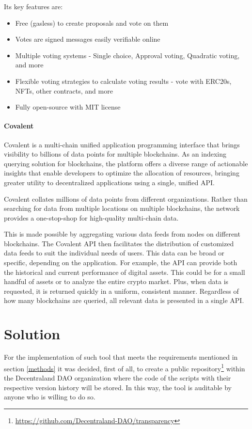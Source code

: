 \documentclass[MSE,Master,english]{twbook}%
\begin{document}
Its key features are:
\begin{itemize}
  \item Free (gasless) to create proposals and vote on them
  \item Votes are signed messages easily verifiable online
  \item Multiple voting systems - Single choice, Approval voting, Quadratic voting, and more
  \item Flexible voting strategies to calculate voting results - vote with ERC20s, NFTs, other contracts, and more
  \item Fully open-source with MIT license
\end{itemize}

\subsubsection{Covalent}
Covalent\cite{covalent} is a multi-chain unified application programming interface that brings visibility to billions of data points for multiple blockchains. As an indexing querying solution for blockchains, the platform offers a diverse range of actionable insights that enable developers to optimize the allocation of resources, bringing greater utility to decentralized applications using a single, unified API.

Covalent collates millions of data points from different organizations. Rather than searching for data from multiple locations on multiple blockchains, the network provides a one-stop-shop for high-quality multi-chain data.

This is made possible by aggregating various data feeds from nodes on different blockchains. The Covalent API then facilitates the distribution of customized data feeds to suit the individual needs of users. This data can be broad or specific, depending on the application. For example, the API can provide both the historical and current performance of digital assets. This could be for a small handful of assets or to analyze the entire crypto market. Plus, when data is requested, it is returned quickly in a uniform, consistent manner. Regardless of how many blockchains are queried, all relevant data is presented in a single API.

\chapter{Solution\label{solution}}
For the implementation of such tool that meets the requirements mentioned in section \ref{methods} it was decided, first of all, to create a public repository\footnote{\url{https://github.com/Decentraland-DAO/transparency}} within the Decentraland DAO organization where the code of the scripts with their respective version history will be stored. In this way, the tool is auditable by anyone who is willing to do so.
\end{document}
